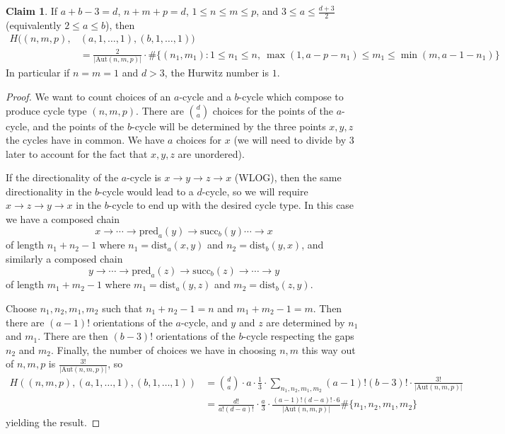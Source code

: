 \documentclass[11pt]{article}           %
\newcommand{\Aut}{\text{Aut}}
\theoremstyle{definition}
\newtheorem{claim}{Claim}[section]
\begin{document}
\begin{claim}
  If $a+b-3=d$, $n+m+p=d$, $1\leq n\leq m\leq p$, and $3\leq a\leq \frac{d+3}{2}$ (equivalently $2\leq a\leq b$), then
\begin{align*}
  H((n,m,p),&(a,1,\dots,1),(b,1,\dots,1))\\
  &=\frac 2{|\Aut(n,m,p)|}\cdot \#\{(n_1,m_1):1\leq n_1\leq n,\ \max(1,a-p-n_1)\leq m_1\leq \min(m,a-1-n_1)\}
\end{align*}
In particular if $n=m=1$ and $d>3$, the Hurwitz number is $1$.
\end{claim}
\begin{proof}
  We want to count choices of an $a$-cycle and a $b$-cycle which compose to produce cycle type $(n,m,p)$.
  There are $\binom da$ choices for the points of the $a$-cycle, and the
  points of the $b$-cycle will be determined by the three points $x,y,z$ the cycles have in common. We have $a$ choices for
  $x$ (we will need to divide by $3$ later to account for the fact that $x,y,z$ are unordered).

  If the directionality of the $a$-cycle is $x\to y\to z\to x$ (WLOG), then the same directionality in the $b$-cycle would lead to
  a $d$-cycle, so we will require $x\to z\to y\to x$ in the $b$-cycle to end up with the desired cycle type. In this case
  we have a composed chain \[x\to\cdots\to \text{pred}_a(y)\to\text{succ}_b(y)\cdots\to x\] of length $n_1+n_2-1$ where $n_1=\text{dist}_a(x,y)$ and $n_2=\text{dist}_b(y,x)$, and similarly a composed chain
  \[
  y\to\cdots\to\text{pred}_a(z)\to\text{succ}_b(z)\to\cdots\to y
  \]
  of length $m_1+m_2-1$ where $m_1=\text{dist}_a(y,z)$ and $m_2=\text{dist}_b(z,y)$.

  Choose $n_1,n_2,m_1,m_2$ such that $n_1+n_2-1=n$ and $m_1+m_2-1=m$. Then there are $(a-1)!$ orientations of the $a$-cycle, and $y$ and $z$ are determined by $n_1$ and $m_1$. There are then $(b-3)!$ orientations of the $b$-cycle respecting the gaps $n_2$ and $m_2$. Finally, the number of choices we have in choosing $n,m$ this way out of $n,m,p$ is $\frac{3!}{|\Aut(n,m,p)|}$, so
  \begin{align*}
    H((n,m,p),(a,1,\dots,1),(b,1,\dots,1))&=\binom da\cdot a\cdot\frac 13\cdot\sum_{n_1,n_2,m_1,m_2}(a-1)!(b-3)!\cdot\frac{3!}{|\Aut(n,m,p)|} \\
    &=\frac{d!}{a!(d-a)!}\cdot\frac a3\cdot\frac{(a-1)!(d-a)!\cdot 6}{|\Aut(n,m,p)|}\#\{n_1,n_2,m_1,m_2\}
  \end{align*}
  yielding the result.
  
\end{proof}
\end{document}
